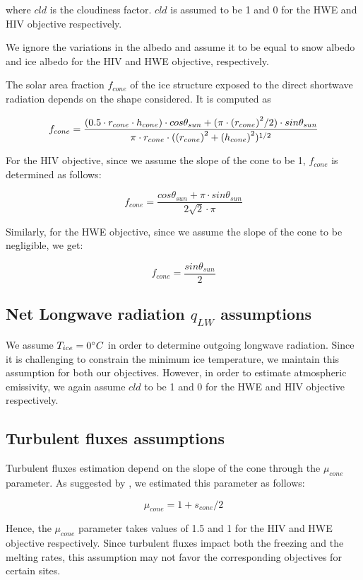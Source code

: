 \documentclass[tc, manuscript]{copernicus}
\begin{document}
where $cld$ is the cloudiness factor. $cld$ is assumed to be 1 and 0 for the HWE and HIV objective
respectively.

We ignore the variations in the albedo and assume it to be equal to snow albedo and ice albedo for the HIV and
HWE objective, respectively.

The solar area fraction $f_{cone}$ of the ice structure exposed to the direct shortwave radiation depends on the
shape considered. It is computed as

\begin{equation}
		f_{cone} =\frac{(0.5 \cdot r_{cone} \cdot h_{cone}) \cdot cos \theta_{sun} +(\pi \cdot
			{(r_{cone})}^2/2) \cdot sin \theta_{sun} }{\pi \cdot r_{cone} \cdot ({(r_{cone})}^2+{(h_{cone})}^2)^{1/2}}\\
\end{equation}

For the HIV objective, since we assume the slope of the cone to be 1, $f_{cone}$ is determined as follows:

\begin{equation}
		f_{cone} =\frac{ cos \theta_{sun} + \pi \cdot sin \theta_{sun} }{2\sqrt{2} \cdot \pi }
\end{equation}

Similarly, for the HWE objective, since we assume the slope of the cone to be negligible, we get:

\begin{equation}
		f_{cone} =\frac{ sin \theta_{sun} }{2 }
\end{equation}

\subsection{Net Longwave radiation \texorpdfstring{$q_{LW}$}{Lg} assumptions} 

We assume $T_{ice} = 0 ^{\circ} C$ in order to determine outgoing longwave radiation. Since it is challenging to
constrain the minimum ice temperature, we maintain this assumption for both our objectives. However, in order to
estimate atmospheric emissivity, we again assume $cld$ to be 1 and 0 for the HWE and HIV objective respectively.

\subsection{Turbulent fluxes assumptions} \label{sec:Qs}

Turbulent fluxes estimation depend on the slope of the cone through the $\mu_{cone}$ parameter. As suggested 
by \citet{oerlemansBriefCommunicationGrowth2021}, we estimated this parameter as follows:

\begin{equation}
  \mu_{cone} =1 + s_{cone}/2
\end{equation}

Hence, the $\mu_{cone}$ parameter takes values of 1.5 and 1 for the HIV and HWE objective respectively.  Since
turbulent fluxes impact both the freezing and the melting rates, this assumption may not favor the corresponding
objectives for certain sites.

\noappendix 



\end{document}
